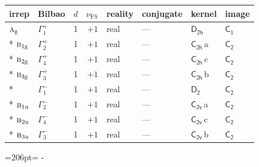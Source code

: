 \documentclass[10pt,a4paper]{article}
\newcommand{\needspace}[1]{\par\penalty-100\begingroup\dimen0=#1\relax\dimen2=\pagegoal
  \advance\dimen2-\pagetotal\ifdim\dimen0>\dimen2\relax\ifdim\dimen2>0pt\vfil\break\fi\fi
  \endgroup}
\numberwithin{equation}{section}
\newcommand{\grp}[1]{\mathsf{#1}}
\newcommand{\irr}[1]{\text{\normalfont\scshape #1}}
\newcommand{\detbox}[1]{{\setlength{\fboxsep}{1pt}\fbox{#1}}}
\newcommand{\ptag}[1]{\mathrm{#1}}
\newcommand{\clsletter}[1]{\,{\scriptsize\color{black!55}#1}}
\newcommand{\fsind}{\nu_{\mathrm{FS}}}
\begin{document}
{\small\renewcommand{\arraystretch}{1.25}\begin{longtable}{@{}llrrllll@{}}\toprule
irrep & Bilbao & $d$ & $\fsind$ & reality & conjugate & kernel & image\\\midrule\endhead
\bottomrule\endfoot\endlastfoot
$\irr{a}_{\ptag{g}}$ & $\Gamma_{1}^{+}$ & 1 & $+1$ & real & --- & \href{D2h.pdf}{$\grp{D_{2h}}$} & \href{C1.pdf}{$\grp{C_{1}}$}\\*
$\irr{b}_{1\ptag{g}}$ & $\Gamma_{2}^{+}$ & 1 & $+1$ & real & --- & \href{C2h.pdf}{$\grp{C_{2h}}$}\clsletter{a} & \href{C2.pdf}{$\grp{C_{2}}$}\\*
$\irr{b}_{2\ptag{g}}$ & $\Gamma_{4}^{+}$ & 1 & $+1$ & real & --- & \href{C2h.pdf}{$\grp{C_{2h}}$}\clsletter{c} & \href{C2.pdf}{$\grp{C_{2}}$}\\*
$\irr{b}_{3\ptag{g}}$ & $\Gamma_{3}^{+}$ & 1 & $+1$ & real & --- & \href{C2h.pdf}{$\grp{C_{2h}}$}\clsletter{b} & \href{C2.pdf}{$\grp{C_{2}}$}\\*
\detbox{$\irr{a}_{\ptag{u}}$} & $\Gamma_{1}^{-}$ & 1 & $+1$ & real & --- & \href{D2.pdf}{$\grp{D_{2}}$} & \href{C2.pdf}{$\grp{C_{2}}$}\\*
$\irr{b}_{1\ptag{u}}$ & $\Gamma_{2}^{-}$ & 1 & $+1$ & real & --- & \href{C2v.pdf}{$\grp{C_{2v}}$}\clsletter{a} & \href{C2.pdf}{$\grp{C_{2}}$}\\*
$\irr{b}_{2\ptag{u}}$ & $\Gamma_{4}^{-}$ & 1 & $+1$ & real & --- & \href{C2v.pdf}{$\grp{C_{2v}}$}\clsletter{c} & \href{C2.pdf}{$\grp{C_{2}}$}\\*
$\irr{b}_{3\ptag{u}}$ & $\Gamma_{3}^{-}$ & 1 & $+1$ & real & --- & \href{C2v.pdf}{$\grp{C_{2v}}$}\clsletter{b} & \href{C2.pdf}{$\grp{C_{2}}$}\\
\bottomrule\end{longtable}}
\needspace{206pt}
\end{document}
